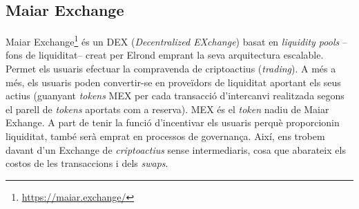 \documentclass[11pt,a4paper]{article}
\begin{document}
\subsection{Maiar Exchange}\label{subsec:maiarexchange}
Maiar Exchange\footnote{\url{https://maiar.exchange/}} és un DEX (\textit{Decentralized EXchange}) basat en \textit{liquidity pools} –fons de liquiditat– creat per Elrond emprant la seva arquitectura escalable. Permet els usuaris efectuar la compravenda de criptoactius (\textit{trading}). A més a més, els usuaris poden convertir-se en proveïdors de liquiditat aportant els seus actius (guanyant \textit{tokens} MEX per cada transacció d'intercanvi realitzada segons el parell de \textit{tokens} aportats com a reserva). MEX és el \textit{token} nadiu de Maiar Exhange. A part de tenir la funció d'incentivar els usuaris perquè proporcionin liquiditat, també serà emprat en processos de governança. Així, ens trobem davant d'un Exchange de \textit{criptoactius} sense intermediaris, cosa que abarateix els costos de les transaccions i dels \textit{swaps}.
\end{document}
